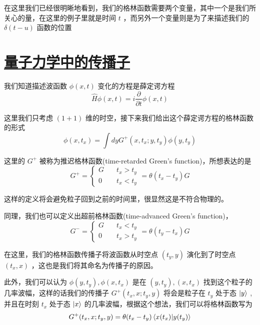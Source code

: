在这里我们已经很明晰地看到，我们的格林函数需要两个变量，其中一个是我们所关心的量，在这里的例子里就是时间 $t$ ，而另外一个变量则是为了来描述我们的 $\delta(t - u)$ 函数的位置


\section{\protect\hyperlink{:}{量子力学中的传播子}}

我们知道描述波函数 $\phi(x,t)$ 变化的方程是薛定谔方程 
\begin{equation*}
    \hat{H}\phi(x,t) = i\frac{\partial}{\partial t}\phi(x,t)
\end{equation*}

这里我们只考虑 $(1 + 1)$ 维的时空，接下来我们给出这个薛定谔方程的格林函数的形式
\begin{equation*}
    \phi(x,t_x) = \int dy G^{+}(x,t_x;y,t_y)\phi(y,t_y)
\end{equation*}

这里的 $G^{+}$ 被称为推迟格林函数(time-retarded Green's function)，所想表达的是
\begin{equation*}
    G^+ = 
    \begin{cases}
        G &\quad t_x > t_y \\
        0 &\quad t_x < t_y
    \end{cases} 
    = \theta(t_x - t_y)G
\end{equation*}

这样的定义将会避免粒子回到之前的时间里，很显然这是不符合物理的。

同理，我们也可以定义出超前格林函数(time-advanced Green's function)，
\begin{equation*}
    G^- =
    \begin{cases}
        G &\quad t_x < t_y \\
        0 &\quad t_x > t_y
    \end{cases}
    = \theta(t_y - t_x)G
\end{equation*}

在这里，我们的格林函数传播子将波函数从时空点 $(t_y,y)$ 演化到了时空点 $(t_x,x)$ ，这也是我们将其命名为传播子的原因。

此外，我们可以认为 $\phi(y,t_y),\phi(x,t_x)$ 是在 $(y,t_y),(x,t_x)$ 找到这个粒子的几率波幅，这样的话我们的传播子 $G^+(t_x,x;t_y,y)$ 将会是粒子在 $t_y$ 处于态 $\ket{y}$ ,并且在时刻 $t_x$ 处于态 $\ket{x}$ 的几率波幅，根据这个想法，我们可以将格林函数写为
\begin{equation*}
    G^+(t_x,x;t_y,y) = \theta(t_x - t_y) \bra{x(t_x)}\ket{y(t_y)}
\end{equation*}

